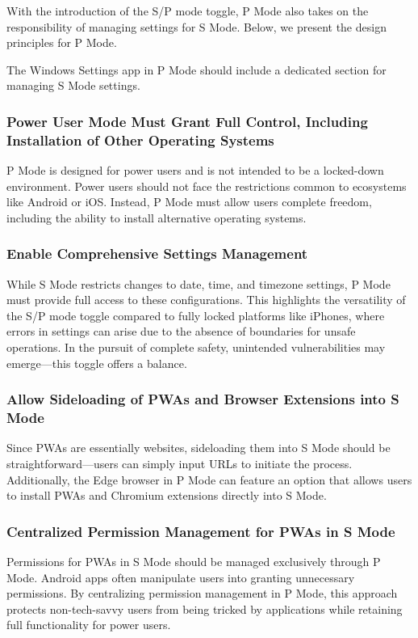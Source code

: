 With the introduction of the S/P mode toggle, P Mode also takes on the responsibility of managing settings for S Mode. Below, we present the design principles for P Mode.

The Windows Settings app in P Mode should include a dedicated section for managing S Mode settings.

\subsubsection{Power User Mode Must Grant Full Control, Including Installation of Other Operating Systems}

P Mode is designed for power users and is not intended to be a locked-down environment. Power users should not face the restrictions common to ecosystems like Android or iOS. Instead, P Mode must allow users complete freedom, including the ability to install alternative operating systems.

\subsubsection{Enable Comprehensive Settings Management}

While S Mode restricts changes to date, time, and timezone settings, P Mode must provide full access to these configurations. This highlights the versatility of the S/P mode toggle compared to fully locked platforms like iPhones, where errors in settings can arise due to the absence of boundaries for unsafe operations. In the pursuit of complete safety, unintended vulnerabilities may emerge—this toggle offers a balance.

\subsubsection{Allow Sideloading of PWAs and Browser Extensions into S Mode}

Since PWAs are essentially websites, sideloading them into S Mode should be straightforward—users can simply input URLs to initiate the process. Additionally, the Edge browser in P Mode can feature an option that allows users to install PWAs and Chromium extensions directly into S Mode.

\subsubsection{Centralized Permission Management for PWAs in S Mode}

Permissions for PWAs in S Mode should be managed exclusively through P Mode. Android apps often manipulate users into granting unnecessary permissions. By centralizing permission management in P Mode, this approach protects non-tech-savvy users from being tricked by applications while retaining full functionality for power users.

